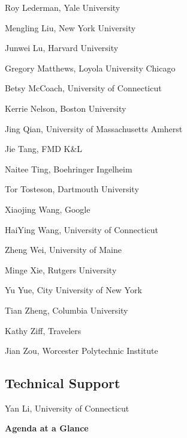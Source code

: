 \documentclass[10pt]{article}
\begin{document}
{Roy Lederman, Yale University

Mengling Liu, New York University

Junwei Lu, Harvard University

Gregory Matthews, Loyola University Chicago

Betsy McCoach, University of Connecticut

Kerrie Nelson, Boston University

Jing Qian, University of Massachusetts Amherst

Jie Tang, FMD K\&L

Naitee Ting, Boehringer Ingelheim

Tor Tosteson, Dartmouth University

Xiaojing Wang, Google

HaiYing Wang, University of Connecticut

Zheng Wei, University of Maine

Minge Xie, Rutgers University

Yu Yue, City University of New York

Tian Zheng, Columbia University

Kathy Ziff, Travelers

Jian Zou, Worcester Polytechnic Institute

\subsection*{Technical Support}

Yan Li, University of Connecticut
}
\clearpage

\onecolumn

{}


\thispagestyle{empty}

\clearpage

\begin{center}
  {\bf\Huge Agenda at a Glance}
\end{center}
\end{document}
